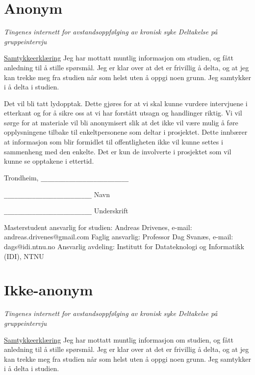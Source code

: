 \section{Anonym}
\begin{center} \textit{Tingenes internett for avstandsoppfølging av kronisk syke \newline
Deltakelse på gruppeintervju}
\end{center}
\underline{Samtykkeerklæring} \newline
Jeg har mottatt muntlig informasjon om studien, og fått anledning til å stille spørsmål. Jeg er klar over at det er frivillig
å delta, og at jeg kan trekke meg fra studien når som helst uten å oppgi noen grunn. Jeg samtykker i å delta i studien.

Det vil bli tatt lydopptak.  Dette gjøres for at vi skal kunne vurdere intervjuene i etterkant og for å sikre oss at
vi har forstått utsagn og handlinger riktig. Vi vil sørge for at materiale vil bli anonymisert slik at det ikke vil
være mulig å føre opplysningene tilbake til enkeltpersonene som deltar i prosjektet. Dette innbærer at informasjon som
blir formidlet til offentligheten ikke vil kunne settes i sammenheng med den enkelte. Det er kun de involverte i prosjektet
som vil kunne se opptakene i ettertid.

Trondheim, \verb|_________________________|

\verb|_________________________|\newline
Navn

\verb|_________________________|\newline
Underskrift \newline

Masterstudent ansvarlig for studien: \newline
	Andreas Drivenes, e-mail: andreas.drivenes@gmail.com \newline
Faglig ansvarlig: \newline
	Professor Dag Svanæs, e-mail: dags@idi.ntnu.no \newline
Ansvarlig avdeling: \newline
	Institutt for Datateknologi og Informatikk (IDI), NTNU

\section{Ikke-anonym}
\begin{center} \textit{Tingenes internett for avstandsoppfølging av kronisk syke \newline
Deltakelse på gruppeintervju}
\end{center}
\underline{Samtykkeerklæring} \newline
Jeg har mottatt muntlig informasjon om studien, og fått anledning til å stille spørsmål. Jeg er klar over at det er frivillig
å delta, og at jeg kan trekke meg fra studien når som helst uten å oppgi noen grunn. Jeg samtykker i å delta i studien.

